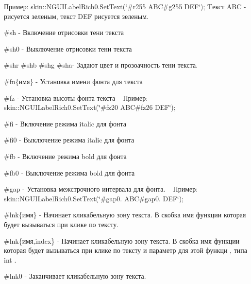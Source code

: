 \begin{DoxyItemize}
 Пример\+: skin\+::\+N\+G\+U\+I\+Label\+Rich0.\+Set\+Text(\char`\"{}\#r255 A\+B\+C\#g255 D\+E\+F\char`\"{}); Tекст A\+BC -\/ рисуется зеленым, текст D\+EF рисуется зеленым.~\newline
 \item \#sh -\/ Включение отрисовки тени текста~\newline
 \item \#sh0 -\/ Выключение отрисовки тени текста~\newline
 \item \#shr \#shb \#shg \#sha-\/ Задают цвет и прозоачность тени текста.~\newline
 \item \#fn\{имя\} -\/ Установка имени фонта для текста~\newline
 \item \#fz -\/ Установка высоты фонта текста ~\newline
 Пример\+: skin\+::\+N\+G\+U\+I\+Label\+Rich0.\+Set\+Text(\char`\"{}\#fz20 A\+B\+C\#fz26 D\+E\+F\char`\"{});~\newline
 \item \#fi -\/ Включение режима italic для фонта ~\newline
 \item \#fi0 -\/ Выключение режима italic для фонта ~\newline
 \item \#fb -\/ Включение режима bold для фонта ~\newline
 \item \#fb0 -\/ Выключение режима bold для фонта ~\newline
 \item \#gap -\/ Установка межстрочного интервала для фонта. ~\newline
 Пример\+: skin\+::\+N\+G\+U\+I\+Label\+Rich0.\+Set\+Text(\char`\"{}\#gap0. A\+B\+C\#gap0. D\+E\+F\char`\"{});~\newline
 \item \#lnk\{имя\} -\/ Начинает кликабельную зону текста. В скобка имя функции которая будет вызываться при клике по тексту.~\newline
 \item \#lnk\{имя,index\} -\/ Начинает кликабельную зону текста. В скобка имя функции которая будет вызываться при клике по тексту и параметр для этой функци , типа int .~\newline
 \item \#lnk0 -\/ Заканчивает кликабельную зону текста.~\newline
~\newline

\end{DoxyItemize}
